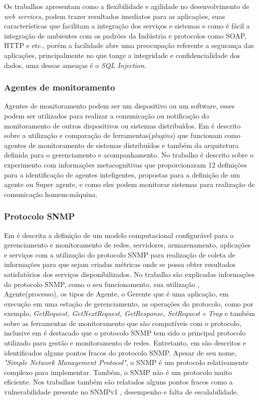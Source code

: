 Os trabalhos \cite{patil2012remote,casola2009sensim} apresentam como a flexibilidade e agilidade no desenvolvimento de \textit{web services}, podem trazer resultados imediatos para as aplicações, suas características que facilitam a integração dos serviços e sistemas e como é fácil a integração de ambientes com os padrões da Indústria e protocolos como SOAP, HTTP e etc., porém a facilidade abre uma preocupação referente a segurança das aplicações, principalmente no que tange a integridade e confidencialidade dos dados, uma dessas ameaças é o \textit{SQL Injection}. 

\subsubsection{Agentes de monitoramento}

Agentes de monitoramento podem ser um dispositivo ou um software, esses podem ser utilizados para realizar a comunicação ou notificação do monitoramento de outros dispositivos ou sistemas distribuídos. Em \cite{smith2008flexible} é descrito sobre a utilização e comparação de ferramentas(\textit{plugins}) que funcionam como agentes de monitoramento de sistemas distribuídos e também da arquitetura definida para o gerenciamento e acompanhamento. No trabalho \cite{puatruct2010agent} é descrito sobre o experimento com informações metacognitivas que proporcionaram 12 definições para a identificação de agentes inteligentes, propostas para a definição de um agente ou Super agente, e como eles podem monitorar sistemas para realização de comunicação homem-máquina.

\subsubsection{Protocolo SNMP}

Em \cite{deGeus} é descrita a definição de um modelo computacional configurável para o gerenciamento e monitoramento de redes, servidores, armazenamento, aplicações e serviços com a utilização do protocolo SNMP para realização de coleta de informações para que sejam criadas métricas onde se possa obter resultados satisfatórios dos serviços disponibilizados. No  trabalho \cite{daSilva} são explicadas informações do protocolo SNMP, como o seu funcionamento, sua utilização , Agente(processo), os tipos de Agente, o Gerente que é uma aplicação, em execução em uma estação de gerenciamento, as operações do protocolo, como por exemplo, \textit{GetRequest, 	GetNextRequest,  GetResponse,  SetRequest  e Trap} e também sobre as ferramentas de monitoramento que são compatíveis com o protocolo, inclusive em \cite{Fraga} é destacado que o protocolo SNMP tem sido o principal protocolo utilizado para gestão e monitoramento de redes. Entretanto, em \cite{deMello} são descritos e identificados alguns pontos fracos do protocolo \acrshort{SNMP}. Apesar  de  seu  nome,  \textit{"Simple  Network  Management  Protocol"},  o  SNMP  é  um protocolo  relativamente  complexo  para  implementar.  Também,  o  SNMP  não  é  um protocolo muito eficiente. Nos trabalhos \cite{phan2009cryptanalysis,subramanyan2000scalable} também são relatados alguns pontos fracos como a vulnerabilidade presente no SNMPv1 , desempenho e falta de escalabilidade.

